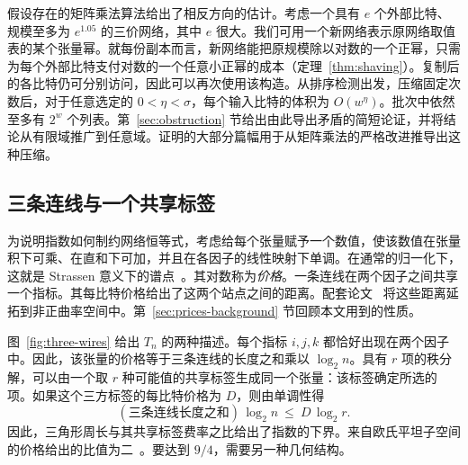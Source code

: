 假设存在的矩阵乘法算法给出了相反方向的估计。考虑一个具有 \(e\) 个外部比特、规模至多为 \(e^{1.05}\) 的三价网络，其中 \(e\) 很大。我们可用一个新网络表示原网络取值表的某个张量幂。就每份副本而言，新网络能把原规模除以对数的一个正幂，只需为每个外部比特支付对数的一个任意小正幂的成本（定理~\ref{thm:shaving}）。复制后的各比特仍可分别访问，因此可以再次使用该构造。从排序检测出发，压缩固定次数后，对于任意选定的 \(0<\eta<\sigma\)，每个输入比特的体积为 \(O(w^\eta)\)。批次中依然至多有 \(2^w\) 个列表。第~\ref{sec:obstruction} 节给出由此导出矛盾的简短论证，并将结论从有限域推广到任意域。证明的大部分篇幅用于从矩阵乘法的严格改进推导出这种压缩。

\subsection{三条连线与一个共享标签}

为说明指数如何制约网络恒等式，考虑给每个张量赋予一个数值，使该数值在张量积下可乘、在直和下可加，并且在各因子的线性映射下单调。在通常的归一化下，这就是 Strassen 意义下的谱点~\cite{spectrum}。其对数称为\emph{价格}。一条连线在两个因子之间共享一个指标。其每比特价格给出了这两个站点之间的距离。配套论文~\cite{oaG} 将这些距离延拓到非正曲率空间中。第~\ref{sec:prices-background} 节回顾本文用到的性质。

图~\ref{fig:three-wires} 给出 \(T_n\) 的两种描述。每个指标 \(i,j,k\) 都恰好出现在两个因子中。因此，该张量的价格等于三条连线的长度之和乘以 \(\log_2 n\)。具有 \(r\) 项的秩分解，可以由一个取 \(r\) 种可能值的共享标签生成同一个张量：该标签确定所选的项。如果这个三方标签的每比特价格为 \(D\)，则由单调性得
\[
      (\text{三条连线长度之和})\,\log_2 n
                                     \ \le\ D\,\log_2 r .
\]
因此，三角形周长与其共享标签费率之比给出了指数的下界。来自欧氏平坦子空间的价格给出的比值为二~\cite{oaG}。要达到 \(9/4\)，需要另一种几何结构。

